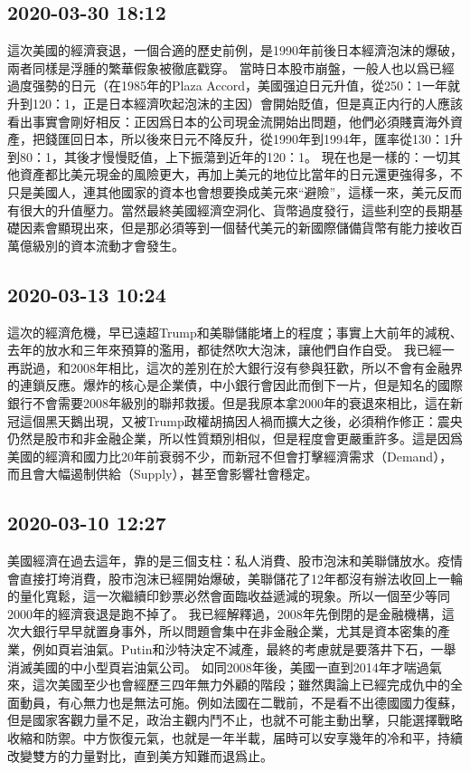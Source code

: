 \documentclass[twocolumn]{ctexart}
\begin{document}
\subsection*{2020-03-30 18:12}

這次美國的經濟衰退，一個合適的歷史前例，是1990年前後日本經濟泡沫的爆破，兩者同樣是浮腫的繁華假象被徹底戳穿。
當時日本股市崩盤，一般人也以爲已經過度强勢的日元（在1985年的Plaza Accord，美國强迫日元升值，從250：1一年就升到120：1，正是日本經濟吹起泡沫的主因）會開始貶值，但是真正内行的人應該看出事實會剛好相反：正因爲日本的公司現金流開始出問題，他們必須賤賣海外資產，把錢匯回日本，所以後來日元不降反升，從1990年到1994年，匯率從130：1升到80：1，其後才慢慢貶值，上下振蕩到近年的120：1。
現在也是一樣的：一切其他資產都比美元現金的風險更大，再加上美元的地位比當年的日元還更強得多，不只是美國人，連其他國家的資本也會想要換成美元來“避險”，這樣一來，美元反而有很大的升值壓力。當然最終美國經濟空洞化、貨幣過度發行，這些利空的長期基礎因素會顯現出來，但是那必須等到一個替代美元的新國際儲備貨幣有能力接收百萬億級別的資本流動才會發生。
\subsection*{2020-03-13 10:24}

這次的經濟危機，早已遠超Trump和美聯儲能堵上的程度；事實上大前年的減稅、去年的放水和三年來預算的濫用，都徒然吹大泡沫，讓他們自作自受。
我已經一再説過，和2008年相比，這次的差別在於大銀行沒有參與狂歡，所以不會有金融界的連鎖反應。爆炸的核心是企業債，中小銀行會因此而倒下一片，但是知名的國際銀行不會需要2008年級別的聯邦救援。但是我原本拿2000年的衰退來相比，這在新冠這個黑天鵝出現，又被Trump政權胡搞因人禍而擴大之後，必須稍作修正：震央仍然是股市和非金融企業，所以性質類別相似，但是程度會更嚴重許多。這是因爲美國的經濟和國力比20年前衰弱不少，而新冠不但會打擊經濟需求（Demand），而且會大幅遏制供給（Supply），甚至會影響社會穩定。
\subsection*{2020-03-10 12:27}

美國經濟在過去這年，靠的是三個支柱：私人消費、股市泡沫和美聯儲放水。疫情會直接打垮消費，股市泡沫已經開始爆破，美聯儲花了12年都沒有辦法收回上一輪的量化寬鬆，這一次繼續印鈔票必然會面臨收益遞減的現象。所以一個至少等同2000年的經濟衰退是跑不掉了。
我已經解釋過，2008年先倒閉的是金融機構，這次大銀行早早就置身事外，所以問題會集中在非金融企業，尤其是資本密集的產業，例如頁岩油氣。Putin和沙特決定不減產，最終的考慮就是要落井下石，一舉消滅美國的中小型頁岩油氣公司。
如同2008年後，美國一直到2014年才喘過氣來，這次美國至少也會經歷三四年無力外顧的階段；雖然輿論上已經完成仇中的全面動員，有心無力也是無法可施。例如法國在二戰前，不是看不出德國國力復蘇，但是國家客觀力量不足，政治主觀内鬥不止，也就不可能主動出擊，只能選擇戰略收縮和防禦。中方恢復元氣，也就是一年半載，届時可以安享幾年的冷和平，持續改變雙方的力量對比，直到美方知難而退爲止。
\end{document}
